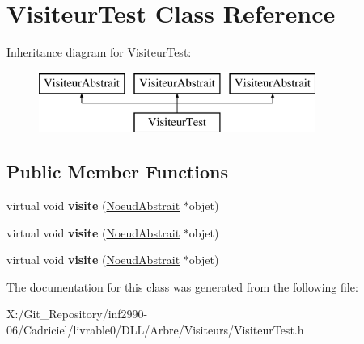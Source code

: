 \hypertarget{class_visiteur_test}{\section{Visiteur\-Test Class Reference}
\label{class_visiteur_test}
}
Inheritance diagram for Visiteur\-Test\-:\begin{figure}[H]
\begin{center}
\leavevmode
\includegraphics[height=2.000000cm]{class_visiteur_test}
\end{center}
\end{figure}
\subsection*{Public Member Functions}
\begin{DoxyCompactItemize}
\item 
\hypertarget{class_visiteur_test_a6692440287f121399d334603dedf04f6}{virtual void {\bfseries visite} (\hyperlink{class_noeud_abstrait}{Noeud\-Abstrait} $\ast$objet)}\label{class_visiteur_test_a6692440287f121399d334603dedf04f6}

\item 
\hypertarget{class_visiteur_test_a6692440287f121399d334603dedf04f6}{virtual void {\bfseries visite} (\hyperlink{class_noeud_abstrait}{Noeud\-Abstrait} $\ast$objet)}\label{class_visiteur_test_a6692440287f121399d334603dedf04f6}

\item 
\hypertarget{group__inf2990_ga6692440287f121399d334603dedf04f6}{virtual void {\bfseries visite} (\hyperlink{class_noeud_abstrait}{Noeud\-Abstrait} $\ast$objet)}\label{group__inf2990_ga6692440287f121399d334603dedf04f6}

\end{DoxyCompactItemize}


The documentation for this class was generated from the following file\-:\begin{DoxyCompactItemize}
\item 
X\-:/\-Git\-\_\-\-Repository/inf2990-\/06/\-Cadriciel/livrable0/\-D\-L\-L/\-Arbre/\-Visiteurs/Visiteur\-Test.\-h\end{DoxyCompactItemize}
